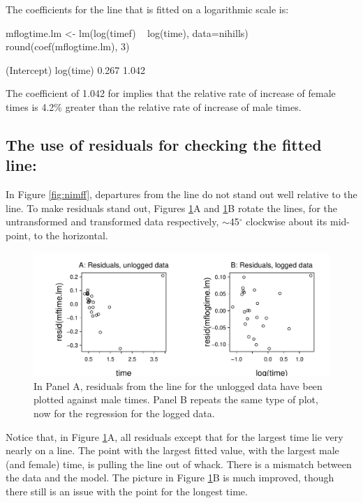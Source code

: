 The coefficients for the line that is fitted on a logarithmic
scale is:
\begin{Schunk}
\begin{Sinput}
mflogtime.lm <- lm(log(timef) ~ log(time),
                   data=nihills)
round(coef(mflogtime.lm), 3)
\end{Sinput}
\begin{Soutput}
(Intercept)   log(time) 
      0.267       1.042 
\end{Soutput}
\end{Schunk}
The coefficient of 1.042 for  implies that the
relative rate of increase of female times is 4.2\% greater than the
relative rate of increase of male times.

\subsection*{The use of residuals for checking the fitted line:}
In Figure \ref{fig:nimff}, departures from the line do not stand out
well relative to the line.  To make residuals stand out, Figures
\ref{fig:to-horiz}A and \ref{fig:to-horiz}B rotate the lines, for the
untransformed and transformed data respectively, $\sim$45$^{\circ}$
clockwise about its mid-point, to the horizontal.

\begin{figure}
\begin{Schunk}


\centerline{\includegraphics[width=\textwidth]{figs/8-tohoriz-mf-1} }

\end{Schunk}
\caption{In Panel A, residuals from the line for the unlogged data
  have been plotted against male times.  Panel B repeats the same
  type of plot, now for the regression for the logged data.\label{fig:to-horiz}}
\end{figure}

\noindent
Notice that, in Figure \ref{fig:to-horiz}A, all residuals except that
for the largest time lie very nearly on a line.  The point with the
largest fitted value, with the largest male (and female) time, is
pulling the line out of whack.  There is a mismatch between the data
and the model.  The picture in Figure \ref{fig:to-horiz}B is much
improved, though there still is an issue with the point for the
longest time.

